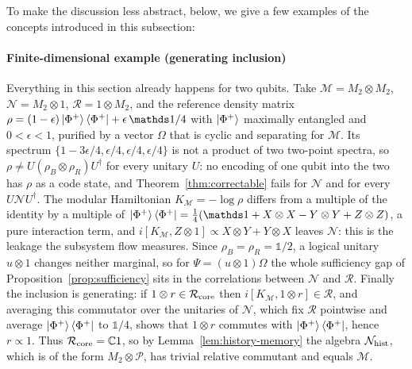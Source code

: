 \documentclass[a4paper,11pt]{article}
\theoremstyle{definition}
\let\mathbbm\mathds
\newcommand{\mR}{\mathcal{R}}
\newcommand{\mN}{\mathcal{N}}
\newcommand{\mM}{\mathcal{M}}
\begin{document}
To make the discussion less abstract, below, we give a few examples of the concepts introduced in this subsection:

\paragraph{Finite-dimensional example (generating inclusion)}
Everything in this section already happens for two qubits. Take $\mM=M_2\otimes M_2$, $\mN=M_2\otimes1$, $\mR=1\otimes M_2$, and the reference density matrix $\rho=(1-\epsilon)\ket{\Phi^+}\bra{\Phi^+}+\epsilon\,\mathbbm 1/4$ with $\ket{\Phi^+}$ maximally entangled and $0<\epsilon<1$, purified by a vector $\Omega$ that is cyclic and separating for $\mM$. Its spectrum $\{1-3\epsilon/4,\epsilon/4,\epsilon/4,\epsilon/4\}$ is not a product of two two-point spectra, so $\rho\ne U(\rho_B\otimes\rho_R)U^\dagger$ for every unitary $U$: no encoding of one qubit into the two has $\rho$ as a code state, and Theorem~\ref{thm:correctable} fails for $\mN$ and for every $U\mN U^\dagger$. The modular Hamiltonian $K_{\mM}=-\log\rho$ differs from a multiple of the identity by a multiple of $\ket{\Phi^+}\bra{\Phi^+}=\tfrac14(\mathbbm 1+X\otimes X-Y\otimes Y+Z\otimes Z)$, a pure interaction term, and $i[K_{\mM},Z\otimes1]\propto X\otimes Y+Y\otimes X$ leaves $\mN$: this is the leakage the subsystem flow measures. Since $\rho_B=\rho_R=\mathbbm 1/2$, a logical unitary $u\otimes1$ changes neither marginal, so for $\Psi=(u\otimes1)\Omega$ the whole sufficiency gap of Proposition~\ref{prop:sufficiency} sits in the correlations between $\mN$ and $\mR$. Finally the inclusion is generating: if $1\otimes r\in\mR_{\rm core}$ then $i[K_{\mM},1\otimes r]\in\mR$, and averaging this commutator over the unitaries of $\mN$, which fix $\mR$ pointwise and average $\ket{\Phi^+}\bra{\Phi^+}$ to $\mathbbm 1/4$, shows that $1\otimes r$ commutes with $\ket{\Phi^+}\bra{\Phi^+}$, hence $r\propto1$. Thus $\mR_{\rm core}=\mathbb C1$, so by Lemma~\ref{lem:history-memory} the algebra $\mN_{\rm hist}$, which is of the form $M_2\otimes\mathcal P$, has trivial relative commutant and equals $\mM$.
\end{document}
